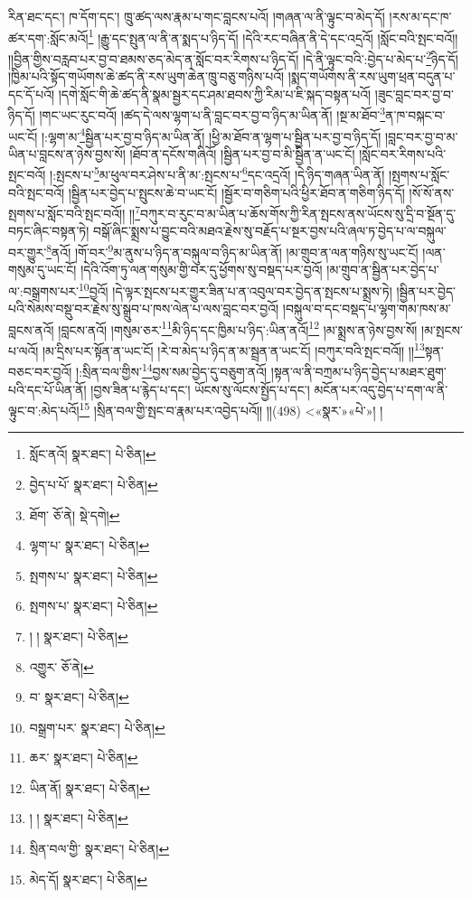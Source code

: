 རིན་ཐང་དང་། ཁ་དོག་དང་། ཁྲུ་ཚད་ལས་རྣམ་པ་གང་བླངས་པའོ། །གཞན་ལ་ནི་ལྟུང་བ་མེད་དོ། །རས་མ་དང་ཁ་ཚར་དག་:སློང་མའོ།\footnote{སློང་ནའོ།  སྣར་ཐང་།  པེ་ཅིན། } །རྒྱུ་དང་སྤུན་ལ་ནི་ན་སྨད་པ་ཉིད་དོ། །དེའི་རང་བཞིན་ནི་དེ་དང་འདྲའོ། །སློང་བའི་སྤང་བའོ།། །།བྱིན་གྱིས་བརླབ་པར་བྱ་བ་ཐམས་ཅད་མེད་ན་སློང་བར་རིགས་པ་ཉིད་དོ། །དེ་ནི་ལྟུང་བའི་:བྱེད་པ་མེད་པ་\footnote{བྱེད་པ་པོ་  སྣར་ཐང་།  པེ་ཅིན། }ཉིད་དོ། །ཁྱིམ་པའི་སྟོད་གཡོགས་ཆེ་ཚད་ནི་རས་ཡུག་ཆེན་ཁྲུ་བཅུ་གཉིས་པའོ། །སྨད་གཡོགས་ནི་རས་ཡུག་ཕྲན་བདུན་པ་དང་དོ་པའོ། །དགེ་སློང་གི་ཆེ་ཚད་ནི་སྣམ་སྦྱར་དང་ཤམ་ཐབས་ཀྱི་རིམ་པ་ཇི་སྐད་བསྟན་པའོ། །ཟུང་བླང་བར་བྱ་བ་ཉིད་དོ། །གང་ཡང་རུང་བའོ། །ཚད་དེ་ལས་ལྷག་པ་ནི་བླང་བར་བྱ་བ་ཉིད་མ་ཡིན་ནོ། །སྔ་མ་ཐོབ་\footnote{ཐོག་  ཅོ་ནེ།  སྡེ་དགེ། }ན་ཁ་བསྐང་བ་ཡང་ངོ། །:ལྷག་མ་\footnote{ལྷག་པ་  སྣར་ཐང་།  པེ་ཅིན། }སྦྱིན་པར་བྱ་བ་ཉིད་མ་ཡིན་ནོ། །ཕྱི་མ་ཐོབ་ན་ལྷག་པ་སྦྱིན་པར་བྱ་བ་ཉིད་དོ། །བླང་བར་བྱ་བ་མ་ཡིན་པ་བླངས་ན་ཉེས་བྱས་སོ། །ཐོབ་ན་དངོས་གཞིའོ། །སྦྱིན་པར་བྱ་བ་མི་སྦྱིན་ན་ཡང་ངོ། །སློང་བར་རིགས་པའི་སྤང་བའོ། །:སྤངས་པ་\footnote{སྤགས་པ་  སྣར་ཐང་།  པེ་ཅིན། }མ་ཕུལ་བར་ཤེས་པ་ནི་མ་:སྤངས་པ་\footnote{སྤགས་པ་  སྣར་ཐང་།  པེ་ཅིན། }དང་འདྲའོ། །དེ་ཉིད་གཞན་ཡིན་ནོ། །སྤགས་པ་སློང་བའི་སྤང་བའོ། །སྦྱིན་པར་བྱེད་པ་སྤུངས་ཆེ་བ་ཡང་ངོ། །སྦྱོར་བ་གཅིག་པའི་ཕྱིར་ཐོབ་ན་གཅིག་ཉིད་དོ། །སོ་སོ་ནས་སྤགས་པ་སློང་བའི་སྤང་བའོ།། །།\footnote{། །  སྣར་ཐང་།  པེ་ཅིན། }བཀུར་བ་རུང་བ་མ་ཡིན་པ་ཆོས་གོས་ཀྱི་རིན་སྤངས་ནས་ཡོངས་སུ་དྲི་བ་སྔོན་དུ་བཏང་ཞིང་བསྟན་ཏེ། བསྒོ་ཞིང་སྨྲས་པ་བྱུང་བའི་མཐའ་རྗེས་སུ་བརྗོད་པ་སྔར་བྱས་པའི་ཞལ་ཏ་བྱེད་པ་ལ་བསྐུལ་བར་གྱུར་\footnote{འགྱུར་  ཅོ་ནེ། }ནའོ། །གོ་བར་\footnote{བ་  སྣར་ཐང་།  པེ་ཅིན། }མ་ནུས་པ་ཉིད་ན་བསྐུལ་བ་ཉིད་མ་ཡིན་ནོ། །མ་གྲུབ་ན་ལན་གཉིས་སུ་ཡང་ངོ། །ལན་གསུམ་དུ་ཡང་ངོ། །དེའི་འོག་ཏུ་ལན་གསུམ་གྱི་བར་དུ་ཕྱོགས་སུ་བསྡད་པར་བྱའོ། །མ་གྲུབ་ན་སྦྱིན་པར་བྱེད་པ་ལ་:བསྒྲགས་པར་\footnote{བསྒྲག་པར་  སྣར་ཐང་།  པེ་ཅིན། }བྱའོ། །དེ་ལྟར་སྤངས་པར་གྱུར་ཟིན་པ་ན་འབུལ་བར་བྱེད་ན་སྤངས་པ་སྨྲས་ཏེ། །སྦྱིན་པར་བྱེད་པའི་སེམས་བསྡུ་བར་རྗེས་སུ་སྒྲུབ་པ་ཁས་ལེན་པ་ལས་བླང་བར་བྱའོ། །བསྐུལ་བ་དང་བསྡད་པ་ལྷག་གམ་ཁས་མ་བླངས་ནའོ། །བླངས་ནའོ། །གསུམ་ཅར་\footnote{ཆར་  སྣར་ཐང་།  པེ་ཅིན། }མི་ཉིད་དང་ཁྱིམ་པ་ཉིད་:ཡིན་ནའོ།\footnote{ཡིན་ནོ།  སྣར་ཐང་།  པེ་ཅིན། } །མ་སྨྲས་ན་ཉེས་བྱས་སོ། །མ་སྤངས་པ་ལའོ། །མ་དྲིས་པར་སྟོན་ན་ཡང་ངོ། །རེ་བ་མེད་པ་ཉིད་ན་མ་སྦྲན་ན་ཡང་ངོ། །བཀུར་བའི་སྤང་བའོ།། །།\footnote{། །  སྣར་ཐང་།  པེ་ཅིན། }སྟན་བཅང་བར་བྱའོ། །:སྲིན་བལ་གྱིས་\footnote{སྲིན་བལ་གྱི་  སྣར་ཐང་།  པེ་ཅིན། }བྱས་སམ་བྱེད་དུ་བཅུག་ནའོ། །སྟན་ལ་ནི་བཀྲམ་པ་ཉིད་བྱེད་པ་མཐར་ཐུག་པའི་དང་པོ་ཡིན་ནོ། །བྱས་ཟིན་པ་རྙེད་པ་དང་། ཡོངས་སུ་ལོངས་སྤྱོད་པ་དང་། མངོན་པར་འདུ་བྱེད་པ་དག་ལ་ནི་ལྟུང་བ་:མེད་པའོ།\footnote{མེད་དོ།  སྣར་ཐང་།  པེ་ཅིན། } །སྲིན་བལ་གྱི་སྤང་བ་རྣམ་པར་འབྱེད་པའོ།། །།(498) <«སྣར་»«པེ་»། །
